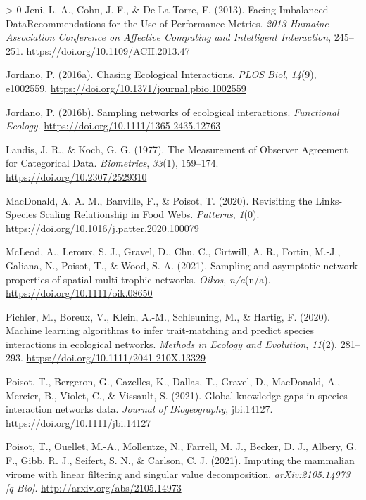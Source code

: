 \documentclass[11pt]{article}
\newlength{\cslhangindent}
\newenvironment{CSLReferences}[3] %
 {%
  \setlength{\parindent}{0pt}
  \ifodd #1 \everypar{\setlength{\hangindent}{\cslhangindent}}\ignorespaces\fi
  \ifnum #2 > 0
  \setlength{\parskip}{#2\baselineskip}
  \fi
 }%
 {}
\begin{document}
\begin{CSLReferences}{1}{0}
\leavevmode\hypertarget{ref-Jeni2013FacImb}{}%
Jeni, L. A., Cohn, J. F., \& De La Torre, F. (2013). Facing Imbalanced
DataRecommendations for the Use of Performance Metrics. \emph{2013
Humaine Association Conference on Affective Computing and Intelligent
Interaction}, 245--251. \url{https://doi.org/10.1109/ACII.2013.47}

\leavevmode\hypertarget{ref-Jordano2016ChaEco}{}%
Jordano, P. (2016a). Chasing Ecological Interactions. \emph{PLOS Biol},
\emph{14}(9), e1002559.
\url{https://doi.org/10.1371/journal.pbio.1002559}

\leavevmode\hypertarget{ref-Jordano2016SamNet}{}%
Jordano, P. (2016b). Sampling networks of ecological interactions.
\emph{Functional Ecology}. \url{https://doi.org/10.1111/1365-2435.12763}

\leavevmode\hypertarget{ref-Landis1977MeaObs}{}%
Landis, J. R., \& Koch, G. G. (1977). The Measurement of Observer
Agreement for Categorical Data. \emph{Biometrics}, \emph{33}(1),
159--174. \url{https://doi.org/10.2307/2529310}

\leavevmode\hypertarget{ref-MacDonald2020RevLin}{}%
MacDonald, A. A. M., Banville, F., \& Poisot, T. (2020). Revisiting the
Links-Species Scaling Relationship in Food Webs. \emph{Patterns},
\emph{1}(0). \url{https://doi.org/10.1016/j.patter.2020.100079}

\leavevmode\hypertarget{ref-McLeod2021SamAsy}{}%
McLeod, A., Leroux, S. J., Gravel, D., Chu, C., Cirtwill, A. R., Fortin,
M.-J., Galiana, N., Poisot, T., \& Wood, S. A. (2021). Sampling and
asymptotic network properties of spatial multi-trophic networks.
\emph{Oikos}, \emph{n/a}(n/a). \url{https://doi.org/10.1111/oik.08650}

\leavevmode\hypertarget{ref-Pichler2020MacLea}{}%
Pichler, M., Boreux, V., Klein, A.-M., Schleuning, M., \& Hartig, F.
(2020). Machine learning algorithms to infer trait-matching and predict
species interactions in ecological networks. \emph{Methods in Ecology
and Evolution}, \emph{11}(2), 281--293.
\url{https://doi.org/10.1111/2041-210X.13329}

\leavevmode\hypertarget{ref-Poisot2021GloKno}{}%
Poisot, T., Bergeron, G., Cazelles, K., Dallas, T., Gravel, D.,
MacDonald, A., Mercier, B., Violet, C., \& Vissault, S. (2021). Global
knowledge gaps in species interaction networks data. \emph{Journal of
Biogeography}, jbi.14127. \url{https://doi.org/10.1111/jbi.14127}

\leavevmode\hypertarget{ref-Poisot2021ImpMam}{}%
Poisot, T., Ouellet, M.-A., Mollentze, N., Farrell, M. J., Becker, D.
J., Albery, G. F., Gibb, R. J., Seifert, S. N., \& Carlson, C. J.
(2021). Imputing the mammalian virome with linear filtering and singular
value decomposition. \emph{arXiv:2105.14973 {[}q-Bio{]}}.
\url{http://arxiv.org/abs/2105.14973}


\end{CSLReferences}
\end{document}
